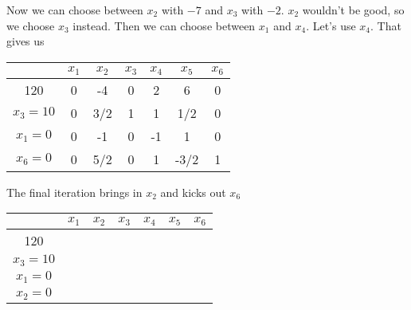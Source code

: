 \begin{Ex}
Now we can choose between $x_2$ with $-7$ and $x_3$ with $-2$. $x_2$ wouldn't be good, so we choose $x_3$ instead. Then we can choose between $x_1$ and $x_4$. Let's use $x_4$. That gives us

\begin{center}
\begin{tabular}{c|cccccc}
  & $x_1$ & $x_2$ & $x_3$ & $x_4$ & $x_5$ & $x_6$ \\\hline
120 & 0 & -4 & 0 & 2 & 6 & 0\\
$x_3=10$ & 0 & 3/2 & 1 & 1 & 1/2 & 0 \\
$x_1=0$ &0  & -1 & 0 & -1 &  1 & 0\\
$x_6=0$ & 0 & 5/2 & 0 & 1 & -3/2 &  1\\
\end{tabular}
\end{center}

The final iteration brings in $x_2$ and kicks out $x_6$

\begin{center}
\begin{tabular}{c|cccccc}
         & $x_1$ & $x_2$ & $x_3$ & $x_4$ & $x_5$ & $x_6$ \\\hline
120      &\\
$x_3=10$ &\\
$x_1=0$  &\\
$x_2=0$  &\\
\end{tabular}
\end{center}
\end{Ex}


